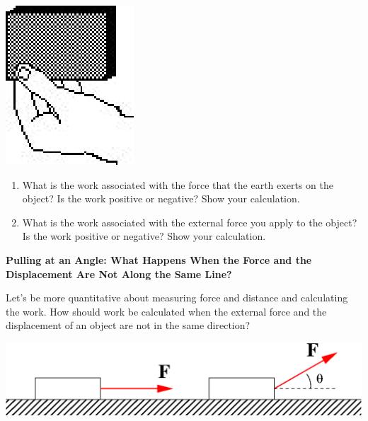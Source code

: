 \vspace{0.3cm}
{\par\centering \includegraphics{work_power/work_power_fig5.eps} \par}
\vspace{0.3cm}

\begin{enumerate}
\item What is the work associated with the force that the earth exerts on the object? Is the work positive or negative? Show your calculation.
\vspace{20mm}

\item What is the work associated with the external force you apply to the object? Is the work positive or negative? Show your calculation.
\vspace{20mm}

\end{enumerate}
\textbf{Pulling at an Angle: What Happens When the Force and the Displacement
Are Not Along the Same Line? }

Let's be more quantitative about measuring force and distance and calculating
the work. How should work be calculated when the external force and the 
displacement of an object are not in the same direction?

\vspace{0.3cm}
{\par\centering \includegraphics{work_power/work_power_fig6b.eps} \par}
\vspace{0.3cm}

